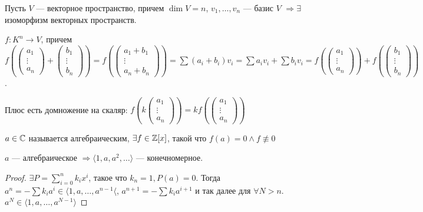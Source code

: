 \begin{remark}[Напоминание]
    Пусть $V$ --- векторное пространство, причем  $\dim V = n$,  $v_1, \ldots, v_n$ --- базис $V$  $\Rightarrow \exists$ изоморфизм векторных пространств.

    $f\!: K^n \to V$, причем  $f(\begin{pmatrix} a_1 \\ \vdots \\ a_n \end{pmatrix} + \begin{pmatrix} b_1 \\ \vdots \\ b_n \end{pmatrix}) = f(\begin{pmatrix} a_1 + b_1 \\ \vdots \\ a_n + b_n \end{pmatrix}) = \sum (a_i + b_i) v_i = \sum a_iv_i + \sum b_iv_i = f(\begin{pmatrix} a_1 \\ \vdots \\ a_n \end{pmatrix}) + f(\begin{pmatrix} b_1 \\ \vdots \\ b_n \end{pmatrix})$.

    Плюс есть домножение на скаляр: $f(k\begin{pmatrix} a_1 \\ \vdots \\ a_n \end{pmatrix}) = kf(\begin{pmatrix} a_1 \\ \vdots \\ a_n \end{pmatrix})$
\end{remark}
\begin{definition}
    $a \in \mathbb{C}$ называется алгебраическим,  $\exists f \in \mathbb{Z}[x]$, такой что  $f(a) = 0 \land f \not\equiv 0$
\end{definition}
 \begin{statement}
     $a$ --- алгебраическое  $\Rightarrow \langle 1, a, a^2, \ldots \rangle$ --- конечномерное. 
\end{statement}
\begin{proof}
    $\exists P = \sum\limits_{i=0}^n k_i x^i$, такое что  $k_n = 1, P(a) = 0$. Тогда $a^n = -\sum k_i a^i \in \langle 1, a, \ldots, a^{n-1} \langle$, $a^{n+1} = -\sum k_i a^{i+1}$ и так далее для  $\forall N > n$.  $a^N \in \langle 1, a,\ldots, a^{N-1} \rangle$
\end{proof}
